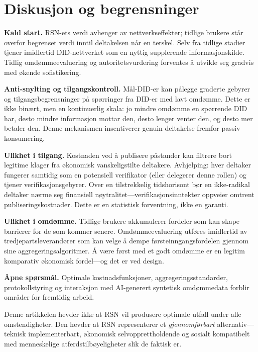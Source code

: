 \documentclass[11pt,a4paper,twocolumn]{article}
\begin{document}
\section{Diskusjon og begrensninger}

\textbf{Kald start.} RSN-ets verdi avhenger av nettverkseffekter; tidlige brukere står overfor begrenset verdi inntil deltakelsen når en terskel. Selv fra tidlige stadier tjener imidlertid DID-nettverket som en nyttig supplerende informasjonskilde. Tidlig omdømmeevaluering og autoritetsvurdering forventes å utvikle seg gradvis med økende sofistikering.

\textbf{Anti-snylting og tilgangskontroll.} Mål-DID-er kan pålegge graderte gebyrer og tilgangsbegrensninger på spørringer fra DID-er med lavt omdømme. Dette er ikke binært, men en kontinuerlig skala: jo mindre omdømme en spørrende DID har, desto mindre informasjon mottar den, desto lenger venter den, og desto mer betaler den. Denne mekanismen insentiverer genuin deltakelse fremfor passiv konsumering.

\textbf{Ulikhet i tilgang.} Kostnaden ved å publisere påstander kan filtrere bort legitime klager fra økonomisk vanskeligstilte deltakere. Avhjelping: hver deltaker fungerer samtidig som en potensiell verifikator (eller delegerer denne rollen) og tjener verifikasjonsgebyrer. Over en tilstrekkelig tidshorisont bør en ikke-radikal deltaker nærme seg finansiell nøytralitet---verifikasjonsinntekter oppveier omtrent publiseringskostnader. Dette er en statistisk forventning, ikke en garanti.

\textbf{Ulikhet i omdømme.} Tidlige brukere akkumulerer fordeler som kan skape barrierer for de som kommer senere. Omdømmeevaluering utføres imidlertid av tredjepartsleverandører som kan velge å dempe førsteinngangsfordelen gjennom sine aggregeringsalgoritmer. Å være først med et godt omdømme er en legitim komparativ økonomisk fordel---og det er ved design.

\textbf{Åpne spørsmål.} Optimale kostnadsfunksjoner, aggregeringsstandarder, protokollstyring og interaksjon med AI-generert syntetisk omdømmedata forblir områder for fremtidig arbeid.

Denne artikkelen hevder ikke at RSN vil produsere optimale utfall under alle omstendigheter. Den hevder at RSN representerer et \emph{gjennomførbart} alternativ---teknisk implementerbart, økonomisk selvopprettholdende og sosialt kompatibelt med menneskelige atferdstilbøyeligheter slik de faktisk er.
\end{document}
